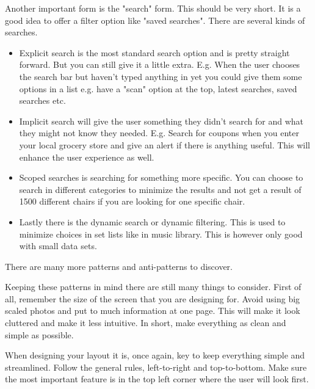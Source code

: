 Another important form is the "search" form. This should be very short. It is a good idea to offer a filter option like "saved searches". There are several kinds of searches. %
\begin{itemize}

\item Explicit search is the most standard search option and is pretty straight forward. But you can still give it a little extra. E.g. When the user chooses the search bar but haven't typed anything in yet you could give them some options in a list e.g. have a "scan" option at the top, latest searches, saved searches etc. \cite{Pattern}

\item Implicit search will give the user something they didn't search for and what they might not know they needed. E.g. Search for coupons when you enter your local grocery store and give an alert if there is anything useful. This will enhance the user experience as well. \cite{Pattern}

\item Scoped searches is searching for something more specific. You can choose to search in different categories to minimize the results and not get a result of 1500 different chairs if you are looking for one specific chair. \cite{Pattern}

\item Lastly there is the dynamic search or dynamic filtering. This is used to minimize choices in set lists like in music library. This is however only good with small data sets.\cite{Pattern}

\end{itemize}
There are many more patterns and anti-patterns to discover. \cite{Pattern}

Keeping these patterns in mind there are still many things to consider. 
First of all, remember the size of the screen that you are designing for. Avoid using big scaled photos and put to much information at one page. This will make it look cluttered and make it less intuitive. \cite{Sardo}
In short, make everything as clean and simple as possible. %

When designing your layout it is, once again, key to keep everything simple and streamlined. 
Follow the general rules, left-to-right and top-to-bottom. Make sure the most important feature is in the top left corner where the user will look first.\cite{Sardo} %

